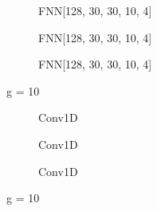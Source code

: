 \documentclass[a4paper,times,12pt]{article}
\begin{document}
\begin{figure}[H]
    \centering
    \begin{subfigure}[t]{0.45\textwidth}
		\centering
        
        \caption{FNN[128, 30, 30, 10, 4]}
		\label{fig:a}
    \end{subfigure}\hfill
    \begin{subfigure}[t]{0.45\textwidth}
		\centering
        
        \caption{FNN[128, 30, 30, 10, 4]}
		\label{fig:b}
    \end{subfigure}\hfill    
    \begin{subfigure}[t]{0.45\textwidth}
        \centering
        
        \caption{FNN[128, 30, 30, 10, 4]}
		\label{fig:c}
    \end{subfigure}
	\caption{g = 10}
\end{figure}


\begin{figure}[H]
    \centering
    \begin{subfigure}[t]{0.45\textwidth}
		\centering
        
        \caption{Conv1D}
		\label{fig:a}
    \end{subfigure}\hfill
    \begin{subfigure}[t]{0.45\textwidth}
		\centering
        
        \caption{Conv1D}
		\label{fig:b}
    \end{subfigure}\hfill    
    \begin{subfigure}[t]{0.45\textwidth}
        \centering
        
        \caption{Conv1D}
		\label{fig:c}
    \end{subfigure}
	\caption{g = 10}
\end{figure}
\end{document}

